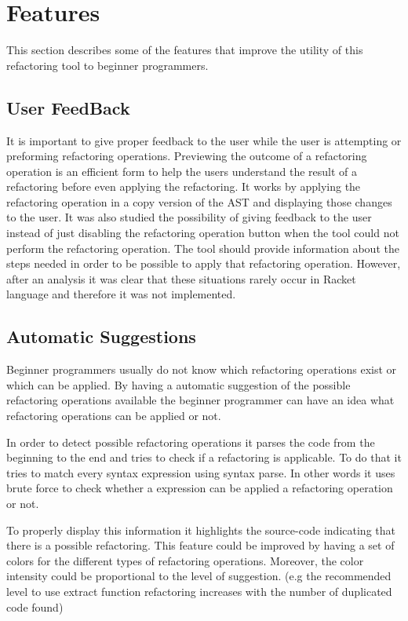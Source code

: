 \section{Features}
This section describes some of the features that improve the utility of this
refactoring tool to beginner programmers. %
\subsection{User FeedBack}
It is important to give proper feedback to the user while the user is attempting or
preforming refactoring operations.
Previewing the outcome of a refactoring operation is an efficient form to
help the users understand the result of a refactoring before even applying the refactoring. %
It works by applying the refactoring operation in a copy version of the AST
and displaying those changes to the user.
It was also studied the possibility of giving feedback to the user instead of
just disabling the refactoring operation button when the tool could not perform the refactoring operation.
The tool should provide information about the steps needed in order to be possible to apply
 that refactoring operation.
However, after an analysis it was clear that these situations rarely occur
in Racket language and therefore it was not implemented.


\subsection{Automatic Suggestions}
Beginner programmers usually do not know which refactoring operations exist or
which can be applied.
By having a automatic suggestion of the possible refactoring operations available
 the beginner programmer can have an idea what refactoring operations can be
 applied or not.

In order to detect possible refactoring operations it parses the code from the
beginning to the end and tries to check if a refactoring is applicable.
To do that it tries to match every syntax expression using syntax parse.
In other words it uses brute force to check whether a expression can be applied
a refactoring operation or not.

To properly display this information it highlights the source-code indicating
that there is a possible refactoring.
This feature could be improved by having a set of colors for the different types
of refactoring operations.
Moreover, the color intensity could be proportional to the level
of suggestion. (e.g the recommended level to use extract function refactoring
increases with the number of duplicated code found) %


